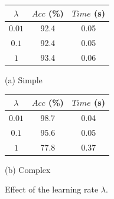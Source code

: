 \begin{figure}[h]
\begin{minipage}[h]{0.5\textwidth}
\begin{center}
{\small{
\begin{tabular}{|c|c|c|}\hline
$\lambda$ & $Acc$ (\%) & $Time$ (s) \\ \hline

$0.01$ &92.4 &0.05  \\
$0.1$ & 92.4& 0.05\\
$1$ & 93.4& 0.06\\ \hline
\end{tabular}
}}
\end{center}
\begin{center}
(a) Simple
\end{center}
\end{minipage}
\begin{minipage}[h]{0.50\textwidth}
\begin{center}
{\small{
\begin{tabular}{|c|c|c|}\hline
$\lambda$ & $Acc$ (\%) & $Time$ (s) \\ \hline

$0.01$ & 98.7&  0.04\\
$0.1$ & 95.6& 0.05 \\
$1$ & 77.8& 0.37\\ \hline
\end{tabular}
}}
\end{center}
\begin{center}
(b) Complex
\end{center}
\end{minipage}

\caption{Effect of the learning rate $\lambda$.}
\label{fig:lambda}
\end{figure}

